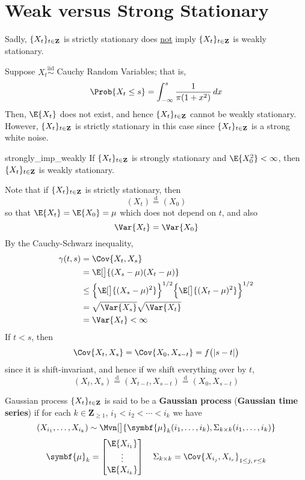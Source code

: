 \section{Weak versus Strong Stationary}
Sadly, $ \{X_t\}_{t\in\mathbf{Z}} $ is strictly stationary does \underline{not} imply
$ \{X_t\}_{t\in\mathbf{Z}} $ is weakly stationary.
\begin{Example}{}{}
    Suppose $ X_t\stackrel{\text{iid}}{\sim} $ Cauchy Random Variables;
    that is,
    \[ \Prob{X_t\le s}=\int_{-\infty}^{s} \frac{1}{\pi(1+x^2)}\, d{x}  \]
    Then, $ \E{X_t} $ does not exist, and hence $ \{X_t\}_{t\in\mathbf{Z}} $ cannot
    be weakly stationary. However, $ \{X_t\}_{t\in\mathbf{Z}} $ is strictly
    stationary in this case since $ \{X_t\}_{t\in\mathbf{Z}} $ is a strong
    white noise.
\end{Example}
\begin{Theorem}{}{strongly_imp_weakly}
    If $ \{X_t\}_{t\in\mathbf{Z}} $ is strongly stationary and $ \E{X_0^2}<\infty $,
    then $ \{X_t\}_{t\in\mathbf{Z}} $ is weakly stationary.
\end{Theorem}
\begin{Proof}{}{}
    Note that if $ \{X_t\}_{t\in\mathbf{Z}} $ is strictly stationary, then
    \[ (X_t)\stackrel{\text{d}}{=}(X_0) \]
    so that $ \E{X_t}=\E{X_0}=\mu $ which does not depend on $ t $, and also
    \[ \Var{X_t}=\Var{X_0} \]
    By the Cauchy-Schwarz inequality,
    \begin{align*}
        \gamma(t,s)
         & =\Cov{X_t,X_s}                                                                     \\
         & =\E[\big]{(X_s-\mu)(X_t-\mu)}                                                      \\
         & \le \set[\Big]{\E[\big]{(X_s-\mu)^2}}^{1/2}\set[\Big]{\E[\big]{(X_t-\mu)^2}}^{1/2} \\
         & =\sqrt{\Var{X_s}}\sqrt{\Var{X_t}}                                                  \\
         & =\Var{X_t}<\infty
    \end{align*}
    If $ t<s $, then
    \[ \Cov{X_t,X_s}=\Cov{X_0,X_{s-t}}=f\bigl(\abs{s-t}\bigr) \]
    since it is shift-invariant, and hence if we shift everything over by $ t $,
    \[ (X_t,X_s)\stackrel{\text{d}}{=}(X_{t-t},X_{s-t})\stackrel{\text{d}}{=}(X_0,X_{s-t}) \]
\end{Proof}
\begin{Definition}{Gaussian process}{}
    $ \{X_t\}_{t\in\mathbf{Z}} $ is said to be a
    \textbf{Gaussian process} (\textbf{Gaussian time series}) if
    for each $ k\in\mathbf{Z}_{\ge 1} $, $ i_1<i_2<\cdots<i_k $ we have
    \[ (X_{i_1},\ldots,X_{i_k})\sim
        \Mvn[\big]{\symbf{\mu}_k(i_1,\ldots,i_k),\Sigma_{k\times k}(i_1,\ldots,i_k)} \]
    \[ \symbf{\mu}_k=\begin{bmatrix}
            \E{X_{i_1}} \\
            \vdots      \\
            \E{X_{i_k}}
        \end{bmatrix}\quad
        \Sigma_{k\times k}=
        \Cov{X_{i_j},X_{i_r}}_{1\le j,\, r\le k} \]
\end{Definition}
